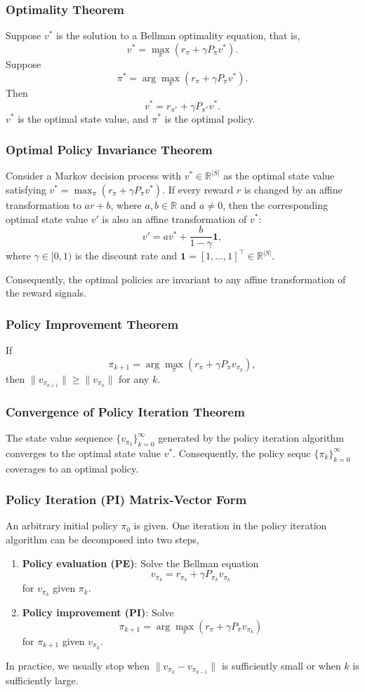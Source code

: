 \documentclass[a4paper,12pt]{report}
\begin{document}
\subsubsection{Optimality Theorem}
Suppose $v^*$ is the solution to a Bellman optimality equation, that is, 
\[v^*=\max_{\pi}\left(r_{\pi}+\gamma P_{\pi}v^*\right).\]
Suppose
\[\pi^*=\arg\max_{\pi}\left(r_{\pi}+\gamma P_{\pi}v^*\right).\]
Then 
\[v^*=r_{\pi^*}+\gamma P_{\pi^*}v^*.\]
$v^*$ is the optimal state value, and $\pi^*$ is the optimal policy.
\subsubsection{Optimal Policy Invariance Theorem}
Consider a Markov decision process with $v^*\in\mathbb{R}^{|S|}$ as the optimal state value satisfying $v^*=\max_{\pi}(r_{\pi}+\gamma P_{\pi}v^*)$. If every reward $r$ is changed by an affine transformation to $ar+b$, where $a,b\in\mathbb{R}$ and $a\neq 0$, then the corresponding optimal state value $v'$ is also an affine transformation of $v^*$:
\[v'=av^*+\frac{b}{1-\gamma}\mathbf{1},\]
where $\gamma\in[0,1)$ is the discount rate and $\mathbf{1}=[1,\ldots,1]^{\top}\in\mathbb{R}^{|S|}$.

Consequently, the optimal policies are invariant to any affine transformation of the reward signals.
\subsubsection{Policy Improvement Theorem}
If 
\[\pi_{k+1}=\arg\max_{\pi}(r_{\pi}+\gamma P_{\pi}v_{\pi_k}),\]
then $\|v_{\pi_{k+1}}\|\geq\|v_{\pi_k}\|$ for any $k$.
\subsubsection{Convergence of Policy Iteration Theorem}
The state value sequence $\{v_{\pi_k}\}_{k=0}^{\infty}$ generated by the policy iteration algorithm converges to the optimal state value $v^*$. Consequently, the policy sequc $\{\pi_k\}_{k=0}^{\infty}$ coverages to an optimal policy.
\subsubsection{Policy Iteration (PI) Matrix-Vector Form}
An arbitrary initial policy $\pi_0$ is given. One iteration in the policy iteration algorithm can be decomposed into two steps,
\begin{enumerate}
\item \textbf{Policy evaluation (PE)}: Solve the Bellman equation
\[v_{\pi_k}=r_{\pi_k}+\gamma P_{\pi_k}v_{\pi_k}\]
for $v_{\pi_k}$ given $\pi_k$.
\item \textbf{Policy improvement (PI)}: Solve
\[\pi_{k+1}=\arg\max_{\pi}(r_{\pi}+\gamma P_{\pi}v_{\pi_k})\]
for $\pi_{k+1}$ given $v_{\pi_k}$.
\end{enumerate}
In practice, we usually stop when $\|v_{\pi_k}-v_{\pi_{k-1}}\|$ is sufficiently small or when $k$ is sufficiently large.
\end{document}

